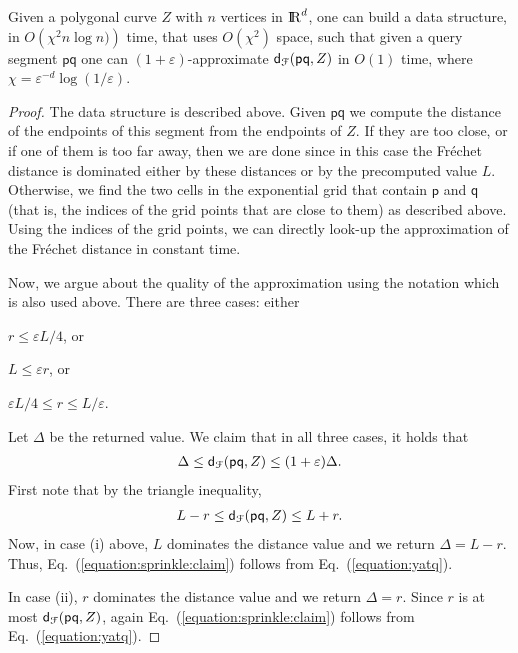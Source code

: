 \documentclass[12pt]{article}
\newcommand{\lemlab}[1]{\label{lemma:#1}}
\newcommand{\Eqref}[1]{Eq.~(\ref{equation:#1})}
\newcommand{\Frechet}{Fr\'{e}c{h}e{}t\xspace}\providecommand{\Arr}{\mathop{\mathrm{\EuScript{A}}}}
\newcommand{\distFr}[2]{\mathsf{d}_{\EuScript{F}}\pth{#1, #2}}
\newcommand{\pnt}{\mathsf{p}}
\newcommand{\pntA}{\mathsf{q}}
\newcommand{\cZ}{{Z}}
\providecommand{\pth}[2][\!]{#1\left({#2}\right)}
\providecommand{\eps}{{\varepsilon}}\renewcommand{\Re}{{\rm I\!\hspace{-0.025em} R}}
\numberwithin{figure}{section}
\numberwithin{equation}{section}
\newcommand{\GridCompl}{\ensuremath{\chi}}
\newcommand{\NgridCompl}{\ensuremath{\eps^{-d}\log(1/\eps)}}
\newcommand{\Eqlab}[1]{\label{equation:#1}}
\newcommand{\gridMin}{\ensuremath{\eps L/4}}
\begin{document}
\begin{lemma}
    \lemlab{epsilon:query:w:curve}Given a polygonal curve $\cZ$ with $n$ vertices in $\Re^d$, one
    can build a data structure, in $O\pth{\GridCompl^2 n \log n )}$ 
    time, that uses $O\pth{ \GridCompl^2 }$ space, such that given a query segment $\pnt \pntA$
    one can $(1+\eps)$-approximate $\distFr{\pnt \pntA}{\cZ}$ in
    $O(1)$ time, where $\GridCompl=\NgridCompl$.
\end{lemma}
\begin{proof}
    The data structure is described above. 
    Given $\pnt \pntA$ we compute the distance of the
    endpoints of this segment from the endpoints of $\cZ$. If they are too
    close, or if one of them is too far away, then we are done since in this
    case the \Frechet distance is dominated either by these distances or by the
    precomputed value $L$.  Otherwise, we find the two cells in the exponential
    grid that contain $\pnt$ and $\pntA$ (that is, the indices of the grid
    points that are close to them) as described above. 
    Using the indices of the grid points, we can directly look-up the
    approximation of the \Frechet distance in constant time.
    
    Now, we argue about the quality of the approximation using the notation
    which is also used above. 
    There are three cases: either
    \begin{inparaenum}[(i)]
    \item $r \leq \gridMin$, or
    \item $L \leq \eps r $, or
    \item $  \gridMin \leq r \leq  L/\eps$.
    \end{inparaenum}
    Let $\Delta$ be the returned value. We claim that in all three cases, it
    holds that
    \begin{align}\Eqlab{sprinkle:claim}
    \Delta \leq \distFr{\pnt\pntA}{\cZ} \leq (1+ \eps) \Delta.
    \end{align}
    First note that by the triangle inequality, 
    \begin{align}\Eqlab{yatq}
    L  - r \leq \distFr{\pnt\pntA}{\cZ} \leq L + r.
    \end{align}
    Now, in case (i) above, $L$ dominates the distance value and we return $\Delta=L-r$.
    Thus, \Eqref{sprinkle:claim} follows from \Eqref{yatq}.

    In case (ii), $r$ dominates the distance value and we return
    $\Delta=r$. Since $r$ is at most $\distFr{\pnt\pntA}{\cZ}$,  again
     \Eqref{sprinkle:claim} follows from \Eqref{yatq}.


\end{proof}
\end{document}
